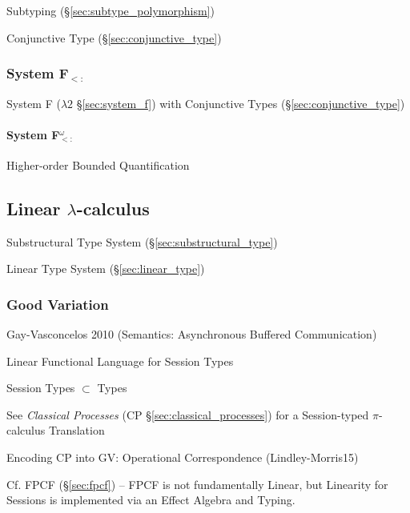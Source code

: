 Subtyping (\S\ref{sec:subtype_polymorphism})

Conjunctive Type (\S\ref{sec:conjunctive_type})



\subsubsection{System F$_{<:}$}\label{sec:system_fsub}

System F ($\lambda2$ \S\ref{sec:system_f}) with Conjunctive Types
(\S\ref{sec:conjunctive_type})



\paragraph{System F$_{<:}^\omega$}\label{sec:fsub_omega}\hfill

Higher-order Bounded Quantification



\subsection{Linear $\lambda$-calculus}\label{sec:linear_lambda}

Substructural Type System (\S\ref{sec:substructural_type})

Linear Type System (\S\ref{sec:linear_type})



\subsubsection{Good Variation}\label{sec:good_variation}
\cite{wadler12}

Gay-Vasconcelos 2010 (Semantics: Asynchronous Buffered
Communication) %

Linear Functional Language for Session Types

Session Types $\subset$ Types

\fist See \emph{Classical Processes} (CP
\S\ref{sec:classical_processes}) for a Session-typed $\pi$-calculus
Translation

Encoding CP into GV: Operational Correspondence (Lindley-Morris15)

\fist Cf. FPCF (\S\ref{sec:fpcf}) \cite{orchard-yoshida16} -- FPCF is
not fundamentally Linear, but Linearity for Sessions is implemented
via an Effect Algebra and Typing.

